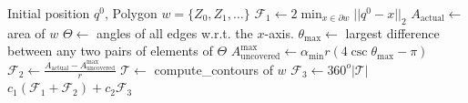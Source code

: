 \documentclass[../main.tex]{subfiles}
\begin{document}
\begin{algorithm}
	\caption{$\text{compute\_}\chi(q^0, w)$}
	\label{alg:metric_algorithm}
	\begin{algorithmic}[1]
		\REQUIRE Initial position $q^0$, Polygon $w=\{Z_0,Z_1,\ldots\}$ 
		\STATE $\mathcal{F}_1\gets2\min_{x\in\partial w}||q^0-x||_2$
		\STATE $A_\text{actual}\gets$ area of $w$
		\STATE $\Theta\gets$ angles of all edges w.r.t. the $x$-axis.
		\STATE $\theta_{\max}\gets$ largest difference between any two pairs of elements of $\Theta$
		\STATE $A^{\max}_{\text{uncovered}}\gets\alpha_{\min}r(4\csc{\theta_{\max}}-\pi)$
		\STATE $\mathcal{F}_2\gets\frac{A_\text{actual}-A^{\max}_{\text{uncovered}}}{r}$
		\STATE $\mathcal{T}\gets$ compute\_contours of $w$
		\STATE $\mathcal{F}_3\gets360^o|\mathcal{T}|$
		\RETURN $c_1(\mathcal{F}_1+\mathcal{F}_2)+c_2\mathcal{F}_3$
	\end{algorithmic}
\end{algorithm}


\end{document}
